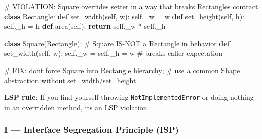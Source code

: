 \documentclass[11pt]{article}
\newenvironment{Shaded}{\begin{snugshade}}{\end{snugshade}}
\newcommand{\CommentTok}[1]{\textcolor[rgb]{0.48,0.49,0.49}{#1}}
\newcommand{\ControlFlowTok}[1]{\textcolor[rgb]{0.99,0.74,0.29}{\textbf{#1}}}
\newcommand{\KeywordTok}[1]{\textcolor[rgb]{0.81,0.81,0.76}{\textbf{#1}}}
\newcommand{\NormalTok}[1]{\textcolor[rgb]{0.81,0.81,0.76}{#1}}
\newcommand{\OperatorTok}[1]{\textcolor[rgb]{0.81,0.81,0.76}{#1}}
\newcommand{\VariableTok}[1]{\textcolor[rgb]{0.15,0.68,0.68}{#1}}
\begin{document}
\begin{Shaded}
\begin{Highlighting}[]
\CommentTok{\# VIOLATION: Square overrides setter in a way that breaks Rectangle\textquotesingle{}s contract}
\KeywordTok{class}\NormalTok{ Rectangle:}
    \KeywordTok{def}\NormalTok{ set\_width(}\VariableTok{self}\NormalTok{, w): }\VariableTok{self}\NormalTok{.\_w }\OperatorTok{=}\NormalTok{ w}
    \KeywordTok{def}\NormalTok{ set\_height(}\VariableTok{self}\NormalTok{, h): }\VariableTok{self}\NormalTok{.\_h }\OperatorTok{=}\NormalTok{ h}
    \KeywordTok{def}\NormalTok{ area(}\VariableTok{self}\NormalTok{): }\ControlFlowTok{return} \VariableTok{self}\NormalTok{.\_w }\OperatorTok{*} \VariableTok{self}\NormalTok{.\_h}

\KeywordTok{class}\NormalTok{ Square(Rectangle):             }\CommentTok{\# Square IS{-}NOT a Rectangle in behavior}
    \KeywordTok{def}\NormalTok{ set\_width(}\VariableTok{self}\NormalTok{, w):}
        \VariableTok{self}\NormalTok{.\_w }\OperatorTok{=} \VariableTok{self}\NormalTok{.\_h }\OperatorTok{=}\NormalTok{ w        }\CommentTok{\# breaks caller expectation}

\CommentTok{\# FIX: don\textquotesingle{}t force Square into Rectangle hierarchy;}
\CommentTok{\# use a common Shape abstraction without set\_width/set\_height}
\end{Highlighting}
\end{Shaded}

\textbf{LSP rule}: If you find yourself throwing \texttt{NotImplementedError} or doing nothing in an overridden method, it\textquotesingle s an LSP violation.

\subsubsection{I --- Interface Segregation Principle (ISP)}\label{i--interface-segregation-principle-isp}

\end{document}
